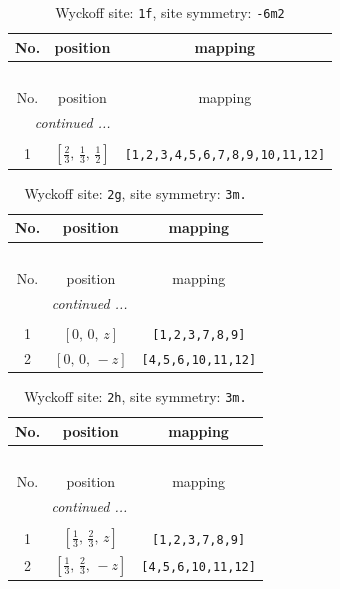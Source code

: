 \documentclass[fleqn,8pt]{jsarticle}
\begin{document}
\renewcommand{\arraystretch}{1.2}
\begin{longtable}{ccc}
\caption{Wyckoff site: {\tt 1f}, site symmetry: {\tt -6m2}}
 \\
 \hline \hline
No. & position & mapping \\ \hline \endfirsthead

\multicolumn{2}{l}{\tablename\ \thetable{}} \\
 \hline \hline
No. & position & mapping \\ \hline \endhead

 \hline \hline
\multicolumn{2}{r}{\footnotesize\it continued ...} \\ \endfoot

 \hline \hline
\multicolumn{2}{r}{} \\ \endlastfoot

1 & $\left[ \frac{2}{3},\, \frac{1}{3},\, \frac{1}{2} \right]$ & {\tt [1,2,3,4,5,6,7,8,9,10,11,12]} \\
\end{longtable}
\renewcommand{\arraystretch}{1.2}
\begin{longtable}{ccc}
\caption{Wyckoff site: {\tt 2g}, site symmetry: {\tt 3m.}}
 \\
 \hline \hline
No. & position & mapping \\ \hline \endfirsthead

\multicolumn{2}{l}{\tablename\ \thetable{}} \\
 \hline \hline
No. & position & mapping \\ \hline \endhead

 \hline \hline
\multicolumn{2}{r}{\footnotesize\it continued ...} \\ \endfoot

 \hline \hline
\multicolumn{2}{r}{} \\ \endlastfoot

1 & $\left[ 0,\, 0,\, z \right]$ & {\tt [1,2,3,7,8,9]} \\ \hline
2 & $\left[ 0,\, 0,\, - z \right]$ & {\tt [4,5,6,10,11,12]} \\
\end{longtable}
\renewcommand{\arraystretch}{1.2}
\begin{longtable}{ccc}
\caption{Wyckoff site: {\tt 2h}, site symmetry: {\tt 3m.}}
 \\
 \hline \hline
No. & position & mapping \\ \hline \endfirsthead

\multicolumn{2}{l}{\tablename\ \thetable{}} \\
 \hline \hline
No. & position & mapping \\ \hline \endhead

 \hline \hline
\multicolumn{2}{r}{\footnotesize\it continued ...} \\ \endfoot

 \hline \hline
\multicolumn{2}{r}{} \\ \endlastfoot

1 & $\left[ \frac{1}{3},\, \frac{2}{3},\, z \right]$ & {\tt [1,2,3,7,8,9]} \\ \hline
2 & $\left[ \frac{1}{3},\, \frac{2}{3},\, - z \right]$ & {\tt [4,5,6,10,11,12]} \\
\end{longtable}
\end{document}
